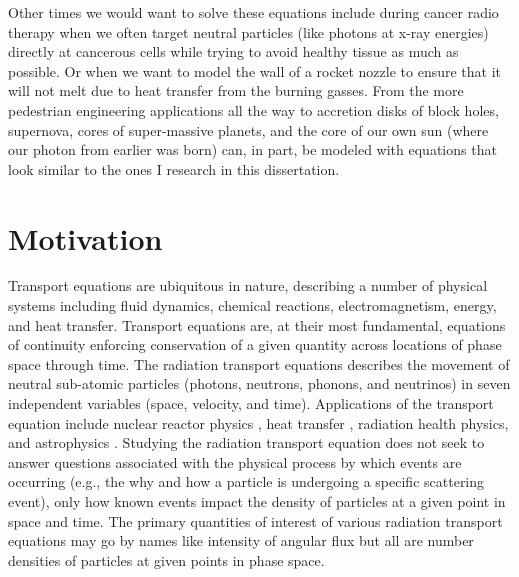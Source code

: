 Other times we would want to solve these equations include during cancer radio therapy when we often target  neutral particles (like photons at x-ray energies) directly at cancerous cells while trying to avoid healthy tissue as much as possible.
Or when we want to model the wall of a rocket nozzle to ensure that it will not melt due to heat transfer from the burning gasses.
From the more pedestrian engineering applications all the way to accretion disks of block holes, supernova, cores of super-massive planets, and the core of our own sun (where our photon from earlier was born) can, in part, be modeled with equations that look similar to the ones I research in this dissertation.


\section{Motivation}

Transport equations are ubiquitous in nature, describing a number of physical systems including fluid dynamics, chemical reactions, electromagnetism, energy, and heat transfer.
Transport equations are, at their most fundamental, equations of continuity enforcing conservation of a given quantity across locations of phase space through time.
The radiation transport equations describes the movement of neutral sub-atomic particles (photons, neutrons, phonons, and neutrinos) in seven independent variables (space, velocity, and time).
Applications of the transport equation include nuclear reactor physics \cite{duderstadt_hamilton}, heat transfer \cite{radheattrans2003}, radiation health physics, and astrophysics \cite{chandrasekhar1960radiative}.
Studying the radiation transport equation does not seek to answer questions associated with the physical process by which events are occurring (e.g., the why and how a particle is undergoing a specific scattering event), only how known events impact the density of particles at a given point in space and time.
The primary quantities of interest of various radiation transport equations may go by names like intensity of angular flux but all are number densities of particles at given points in phase space.

